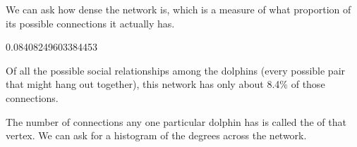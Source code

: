 \documentclass[letterpaper,10pt,english]{jupyterBook}
\begin{document}
\sphinxAtStartPar
We can ask how dense the network is, which is a measure of what proportion of its possible connections it actually has.

\begin{sphinxVerbatim}[commandchars=\\\{\}]
  
\end{sphinxVerbatim}

\begin{sphinxVerbatim}[commandchars=\\\{\}]
0.08408249603384453
\end{sphinxVerbatim}

\sphinxAtStartPar
Of all the possible social relationships among the dolphins (every possible pair that might hang out together), this network has only about 8.4\% of those connections.

\sphinxAtStartPar
The number of connections any one particular dolphin has is called the  of that vertex.  We can ask for a histogram of the degrees across the network.

\begin{sphinxVerbatim}[commandchars=\\\{\}]
  
\end{sphinxVerbatim}

\begin{sphinxVerbatim}[commandchars=\\\{\}]
[0, 9, 6, 6, 5, 8, 8, 7, 4, 4, 2, 2, 1]
\end{sphinxVerbatim}

\begin{sphinxVerbatim}[commandchars=\\\{\}]
   
    
   
  
  
  
\end{sphinxVerbatim}
\end{document}
